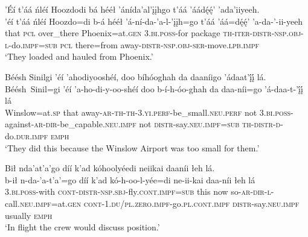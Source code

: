 \ea\label{ex:text9-12-3}
’Éí t’áá ńléí Hoozdodi bá hééł ’ánída’al’įįhgo t’áá ’áádę́ę́’ ’ada’iiyeeh.\\
\gll ’éí	t’áá	ńléí	Hoozdo=di	b-á	hééł	’á-ní-da-’a-l-’įįh=go	t’áá	’áá=dę́ę́’	’a-da-’-ii-yeeh\\
     that	\textsc{pcl}	over\_there	Phoenix=at.\textsc{gen}	3.\textsc{bi}.\textsc{poss}-for	package	\textsc{th}-\textsc{iter}-\textsc{distr}-\textsc{nsp}.\textsc{obj}-\textsc{l}-do.\textsc{impf}=\textsc{sub}	\textsc{pcl}	there=from	away-\textsc{distr}-\textsc{nsp}.\textsc{obj}-\textsc{ser}-move.\textsc{lpb}.\textsc{impf}\\
\glt `They loaded and hauled from Phoenix.'
\z

\ea\label{ex:text9-12-4}
Béésh Sinilgi ’éí ’ahodiyooshéí, doo bíhóoghah da daaníigo ’ádaat’į́į́ lá.\\
\gll Béésh~{Sinil=gi}	’éí	’a-ho-di-y-oo-shéí	doo	b-í-h-óo-ghah	da	daa-níi=go	’á-daa-t-’į́į́	lá\\
     Winslow=at.\textsc{sp}	that	away-\textsc{ar}-\textsc{th}-\textsc{th}-3.\textsc{yi}.\textsc{perf}-be\_small.\textsc{neu}.\textsc{perf}	not	3.\textsc{bi}.\textsc{poss}-against-\textsc{ar}-\textsc{dir}-be\_capable.\textsc{neu}.\textsc{impf}	not	\textsc{distr}-say.\textsc{neu}.\textsc{impf}=\textsc{sub}	\textsc{th}-\textsc{distr}-\textsc{d}-do.\textsc{dur}.\textsc{impf}	\textsc{emph}\\
\glt `They did this because the Winslow Airport was too small for them.'
\z

\ea\label{ex:text9-13-1}
Bił nda’at’a’go díí k’ad kóhoolyéedi neiikai daaníi łeh lá.\\
\gll b-ił	n-da-’a-t’a’=go	díí	k’ad	kó-h-oo-l-yée=di	ne-ii-kai	daa-níi	łeh	lá\\
     3.\textsc{bi}.\textsc{poss}-with	\textsc{cont}-\textsc{distr}-\textsc{nsp}.\textsc{sbj}-fly.\textsc{cont}.\textsc{impf}=\textsc{sub}	this	now	so-\textsc{ar}-\textsc{dir}-\textsc{l}-call.\textsc{neu}.\textsc{impf}=at.\textsc{gen}	\textsc{cont}-1.\textsc{du}/\textsc{pl}.\textsc{zero}.\textsc{impf}-go.\textsc{pl}.\textsc{cont}.\textsc{impf}	\textsc{distr}-say.\textsc{neu}.\textsc{impf}	usually	\textsc{emph}\\
\glt `In flight the crew would discuss position.'
\z

